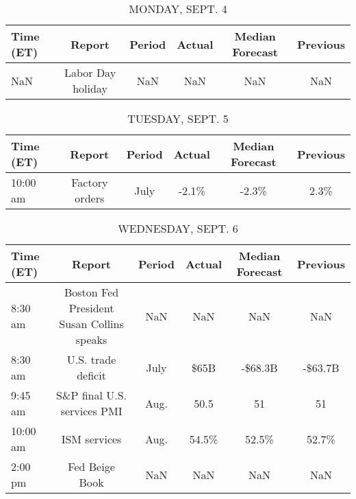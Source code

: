 \documentclass{article}%
\begin{document}
%
\normalsize%


\begin{table}[htbp]%
\caption{MONDAY, SEPT. 4}%
\centering%
\begin{adjustbox}{width=1\textwidth}%
\begin{tabular}{lccccc}
\toprule
Time (ET) &            Report & Period & Actual & Median Forecast & Previous \\
\midrule
      NaN & Labor Day holiday &    NaN &    NaN &             NaN &      NaN \\
\bottomrule
\end{tabular}
%
\end{adjustbox}%
\end{table}

%


\begin{table}[htbp]%
\caption{TUESDAY, SEPT. 5}%
\centering%
\begin{adjustbox}{width=1\textwidth}%
\begin{tabular}{lccccc}
\toprule
Time (ET) &         Report & Period & Actual & Median Forecast & Previous \\
\midrule
 10:00 am & Factory orders &   July &  -2.1\% &           -2.3\% &     2.3\% \\
\bottomrule
\end{tabular}
%
\end{adjustbox}%
\end{table}

%


\begin{table}[htbp]%
\caption{WEDNESDAY, SEPT. 6}%
\centering%
\begin{adjustbox}{width=1\textwidth}%
\begin{tabular}{lccccc}
\toprule
Time (ET) &                                    Report & Period & Actual & Median Forecast & Previous \\
\midrule
  8:30 am & Boston Fed President Susan Collins speaks &    NaN &    NaN &             NaN &      NaN \\
  8:30 am &                        U.S. trade deficit &   July &   \$65B &         -\$68.3B &  -\$63.7B \\
  9:45 am &               S\&P final U.S. services PMI &   Aug. &   50.5 &              51 &       51 \\
 10:00 am &                              ISM services &   Aug. &  54.5\% &           52.5\% &    52.7\% \\
  2:00 pm &                            Fed Beige Book &    NaN &    NaN &             NaN &      NaN \\
\bottomrule
\end{tabular}
%
\end{adjustbox}%
\end{table}
\end{document}

